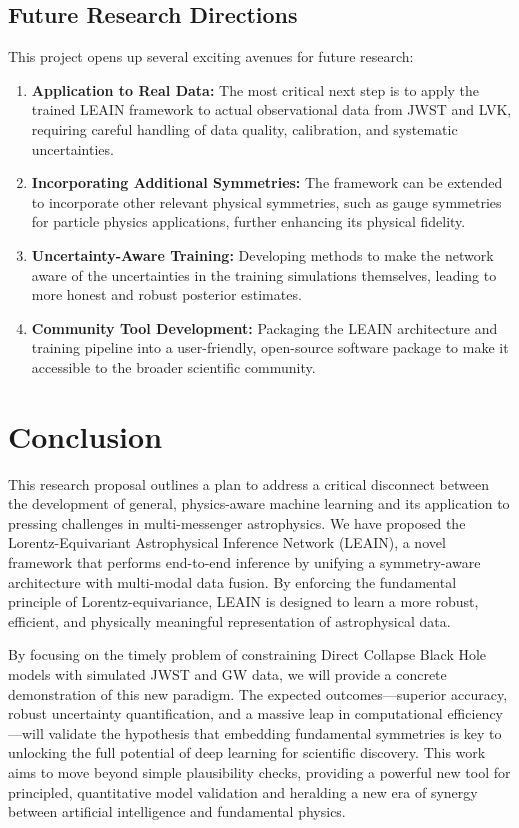 \documentclass[11pt, a4paper]{article}
\begin{document}
\subsection{Future Research Directions}
This project opens up several exciting avenues for future research:
\begin{enumerate}
    \item \textbf{Application to Real Data:} The most critical next step is to apply the trained LEAIN framework to actual observational data from JWST and LVK, requiring careful handling of data quality, calibration, and systematic uncertainties.
    \item \textbf{Incorporating Additional Symmetries:} The framework can be extended to incorporate other relevant physical symmetries, such as gauge symmetries for particle physics applications, further enhancing its physical fidelity.
    \item \textbf{Uncertainty-Aware Training:} Developing methods to make the network aware of the uncertainties in the training simulations themselves, leading to more honest and robust posterior estimates.
    \item \textbf{Community Tool Development:} Packaging the LEAIN architecture and training pipeline into a user-friendly, open-source software package to make it accessible to the broader scientific community.
\end{enumerate}

\section{Conclusion}
This research proposal outlines a plan to address a critical disconnect between the development of general, physics-aware machine learning and its application to pressing challenges in multi-messenger astrophysics. We have proposed the Lorentz-Equivariant Astrophysical Inference Network (LEAIN), a novel framework that performs end-to-end inference by unifying a symmetry-aware architecture with multi-modal data fusion. By enforcing the fundamental principle of Lorentz-equivariance, LEAIN is designed to learn a more robust, efficient, and physically meaningful representation of astrophysical data.

By focusing on the timely problem of constraining Direct Collapse Black Hole models with simulated JWST and GW data, we will provide a concrete demonstration of this new paradigm. The expected outcomes—superior accuracy, robust uncertainty quantification, and a massive leap in computational efficiency—will validate the hypothesis that embedding fundamental symmetries is key to unlocking the full potential of deep learning for scientific discovery. This work aims to move beyond simple plausibility checks, providing a powerful new tool for principled, quantitative model validation and heralding a new era of synergy between artificial intelligence and fundamental physics.
\end{document}
